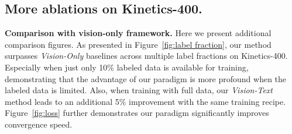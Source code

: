 \documentclass[letterpaper]{article} \usepackage{aaai23}  \usepackage{times}  \usepackage{helvet}  \usepackage{courier}  \usepackage[hyphens]{url}  \usepackage{graphicx} \urlstyle{rm} \def\UrlFont{\rm}  \usepackage{natbib}  \usepackage{caption} \frenchspacing  \setlength{\pdfpagewidth}{8.5in}  \setlength{\pdfpageheight}{11in}  \usepackage{algorithm}
\begin{document}
\subsection{More ablations on Kinetics-400.}\label{sec:ab}



\textbf{Comparison with vision-only framework.}
Here we present additional comparison figures.
As presented in Figure~\ref{fig:label fraction}, our method surpasses \emph{Vision-Only} baselines across multiple label fractions on Kinetics-400.
Especially when just only 10\% labeled data is available for training, demonstrating that the advantage of our paradigm is more profound when the labeled data is limited.
Also, when training with full data, our \emph{Vision-Text} method leads to an additional 5\% improvement with the same training recipe.
Figure~\ref{fig:loss} further demonstrates our paradigm significantly improves convergence speed.
\end{document}
